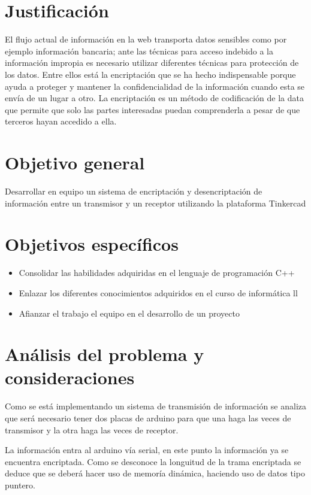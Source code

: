 \documentclass{article}
\begin{document}
\section{Justificación} 
\label{contenido}
El flujo actual de información en la web transporta datos sensibles como por ejemplo información bancaria; ante las técnicas para acceso indebido a la información impropia es necesario utilizar diferentes técnicas para protección de los datos. Entre ellos está la encriptación que se ha hecho indispensable porque ayuda a proteger y mantener la confidencialidad de la información cuando esta se envía de un lugar a otro. La encriptación es un método de codificación de la data que permite que solo las partes interesadas puedan comprenderla a pesar de que terceros hayan accedido a ella.

\section{Objetivo general} 
\label{contenido}
Desarrollar en equipo un sistema de encriptación y desencriptación de información entre un transmisor y un receptor utilizando la plataforma Tinkercad

\section{Objetivos específicos} 
\label{contenido}
\begin{itemize}
\item Consolidar las habilidades adquiridas en el lenguaje de programación C++
\item Enlazar los diferentes conocimientos adquiridos en el curso de informática ll 
\item Afianzar el trabajo el equipo en el desarrollo de un proyecto

\end{itemize}
\section{Análisis del problema y consideraciones}
Como se está implementando un sistema de transmisión de información se analiza que será necesario tener dos placas de arduino para que una haga las veces de transmisor y la otra haga las veces de receptor.

La  información entra al arduino vía serial, en este punto la información ya se encuentra encriptada. Como se desconoce la longuitud de la trama encriptada se deduce que se deberá hacer uso de memoría dinámica, haciendo uso de datos tipo puntero.\\
\end{document}
